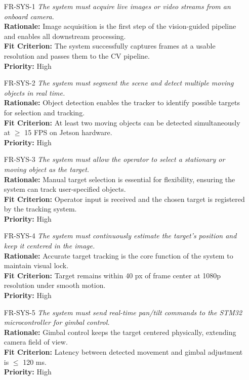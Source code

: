 \documentclass[12pt]{article}
\begin{document}
\begin{itemize}

  \item[FR-SYS-1] \emph{The system must acquire live images or video streams from an
          onboard camera.}\\[2mm]
        {\bf Rationale:} Image acquisition is the first step of the vision-guided pipeline and enables all downstream processing.\\
        {\bf Fit Criterion:} The system successfully captures frames at a usable resolution and passes them to the CV pipeline.\\
        {\bf Priority:} High

  \item[FR-SYS-2] \emph{The system must segment the scene and detect multiple moving
          objects in real time.}\\[2mm]
        {\bf Rationale:} Object detection enables the tracker to identify possible targets for selection and tracking.\\
        {\bf Fit Criterion:} At least two moving objects can be detected simultaneously at $\geq$ 15 FPS on Jetson hardware.\\
        {\bf Priority:} High

  \item[FR-SYS-3] \emph{The system must allow the operator to select a stationary or
          moving object as the target.}\\[2mm]
        {\bf Rationale:} Manual target selection is essential for flexibility, ensuring the system can track user-specified objects.\\
        {\bf Fit Criterion:} Operator input is received and the chosen target is registered by the tracking system.\\
        {\bf Priority:} High

  \item[FR-SYS-4] \emph{The system must continuously estimate the target’s position and
          keep it centered in the image.}\\[2mm]
        {\bf Rationale:} Accurate target tracking is the core function of the system to maintain visual lock.\\
        {\bf Fit Criterion:} Target remains within 40 px of frame center at 1080p resolution under smooth motion.\\
        {\bf Priority:} High

  \item[FR-SYS-5] \emph{The system must send real-time pan/tilt commands to the STM32
          microcontroller for gimbal control.}\\[2mm]
        {\bf Rationale:} Gimbal control keeps the target centered physically, extending camera field of view.\\
        {\bf Fit Criterion:} Latency between detected movement and gimbal adjustment is $\leq$ 120 ms.\\
        {\bf Priority:} High


\end{itemize}
\end{document}
